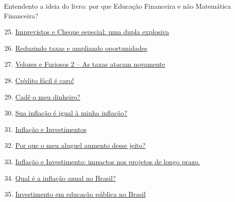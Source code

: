 \begin{apresentacao}{Entendento a ideia do livro: por que Educação Financeira e não Matemática Financeira?}
\begin{multicols}{2}

\begin{enumerate}[label=Atividade \arabic* --, wide]\setcounter{enumi}{24}
\item \hyperref[fin-ativ-25]{Imprevistos e Cheque especial: uma dupla explosiva}
\item \hyperref[fin-ativ-26]{Reduzindo taxas e ampliando oportunidades}
\item \hyperref[fin-ativ-27]{Velozes e Furiosos 2 -- As taxas atacam novamente}
\item \hyperref[fin-ativ-28]{Crédito fácil é caro!}
\end{enumerate}
\vspace{1em}

\begin{enumerate}[label=Atividade \arabic* --, wide]\setcounter{enumi}{28}
\item \hyperref[fin-ativ-29]{Cadê o meu dinheiro?}
\item \hyperref[fin-ativ-30]{Sua inflação é igual à minha inflação?}
\item \hyperref[fin-ativ-31]{Inflação e Investimentos}
\item \hyperref[fin-ativ-32]{Por que o meu aluguel aumento desse jeito?}
\end{enumerate}

\begin{enumerate}[label=Atividade \arabic* --, wide]\setcounter{enumi}{32}
\item \hyperref[fin-ativ-33]{Inflação e Investimento: impactos nos projetos de longo prazo.}
\item \hyperref[fin-ativ-34]{Qual é a inflação anual no Brasil?}
\end{enumerate}
\vspace{1em}

\columnbreak
{}
\begin{enumerate}[label=Atividade \arabic* --, wide]\setcounter{enumi}{34}
\item \hyperref[fin-ativ-35]{Investimento em educação pública no Brasil}
\end{enumerate}


\end{multicols}
\end{apresentacao}

